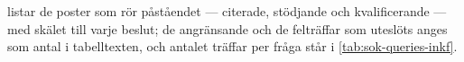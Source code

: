  listar de poster som rör påståendet ---
citerade, stödjande och kvalificerande --- med skälet till varje beslut;
de angränsande och de felträffar som uteslöts anges som antal i
tabelltexten, och antalet träffar per fråga står i
\cref{tab:sok-queries-inkf}.
